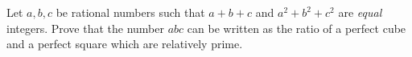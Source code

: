Let $a,b,c$ be rational numbers such that $a+b+c$ and $a^2+b^2+c^2$ are \textit{equal} integers. Prove that the number $abc$ can be written as the ratio of a perfect cube and  a perfect square which are relatively prime.